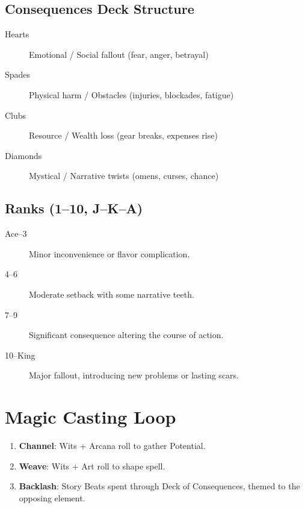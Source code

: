 \subsection{Consequences Deck Structure}

\begin{description}
\item[Hearts] Emotional / Social fallout (fear, anger, betrayal)
\item[Spades] Physical harm / Obstacles (injuries, blockades, fatigue)
\item[Clubs] Resource / Wealth loss (gear breaks, expenses rise)
\item[Diamonds] Mystical / Narrative twists (omens, curses, chance)
\end{description}

\subsection{Ranks (1--10, J--K--A)}

\begin{description}
\item[Ace--3] Minor inconvenience or flavor complication.
\item[4--6] Moderate setback with some narrative teeth.
\item[7--9] Significant consequence altering the course of action.
\item[10--King] Major fallout, introducing new problems or lasting scars.
\end{description}

\section{Magic Casting Loop}

\begin{enumerate}
\item \textbf{Channel}: Wits + Arcana roll to gather Potential.
\item \textbf{Weave}: Wits + Art roll to shape spell.
\item \textbf{Backlash}: Story Beats spent through Deck of Consequences, themed to the opposing element.
\end{enumerate}


